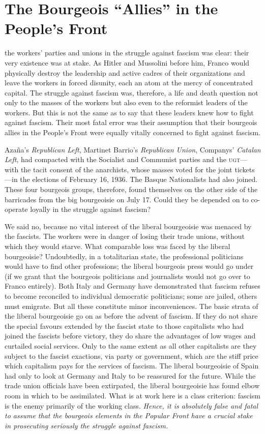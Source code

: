 \chapter{The Bourgeois “Allies” in the People's Front}

 the workers’ parties and unions in the struggle against fascism was clear: their very existence was at stake. As Hitler and Mussolini before him, Franco would physically destroy the leadership and active cadres of their organizations and leave the workers in forced disunity, each an atom at the mercy of concentrated capital. The struggle against fascism was, therefore, a life and death question not only to the masses of the workers but also even to the reformist leaders of the workers. But this is not the same as to say that these leaders knew how to fight against fascism. Their most fatal error was their assumption that their bourgeois allies in the People’s Front were equally vitally concerned to fight against fascism.

Azaña's \emph{Republican Left}, Martinet Barrio's \emph{Republican Union}, Companys' \emph{Catalan Left}, had compacted with the Socialist and Communist parties and the \textsc{ugt}---with the tacit consent of the anarchists, whose masses voted for the joint tickets---in the elections of February 16, 1936. The Basque Nationalists had also joined. These four bourgeois groups, therefore, found themselves on the other side of the barricades from the big bourgeoisie on July 17. Could they be depended on to co-operate loyally in the struggle against fascism?

We said no, because no vital interest of the liberal bourgeoisie was menaced by the fascists. The workers were in danger of losing their trade unions, without which they would starve. What comparable loss was faced by the liberal bourgeoisie? Undoubtedly, in a totalitarian state, the professional politicians would have to find other professions; the liberal bourgeois press would go under (if we grant that the bourgeois politicians and journalists would not go over to Franco entirely). Both Italy and Germany have demonstrated that fascism refuses to become reconciled to individual democratic politicians; some are jailed, others must emigrate. But all these constitute minor inconveniences. The basic strata of the liberal bourgeoisie go on as before the advent of fascism. If they do not share the special favours extended by the fascist state to those capitalists who had joined the fascists before victory, they do share the advantages of low wages and curtailed social services. Only to the same extent as all other capitalists are they subject to the fascist exactions, via party or government, which are the stiff price which capitalism pays for the services of fascism. The liberal bourgeoisie of Spain had only to look at Germany and Italy to be reassured for the future. While the trade union officials have been extirpated, the liberal bourgeoisie has found elbow room in which to be assimilated. What is at work here is a class criterion: fascism is the enemy primarily of the working class. \emph{Hence, it is absolutely false and fatal to assume that the bourgeois elements in the Popular Front have a crucial stake in prosecuting seriously the struggle against fascism.}

